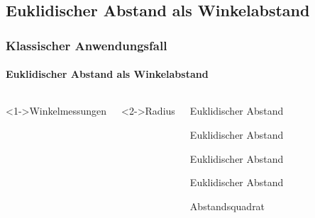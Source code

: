 \documentclass{beamer}
\begin{document}
\subsection{Euklidischer Abstand als Winkelabstand}
\begin{frame}
\frametitle{Klassischer Anwendungsfall}
\framesubtitle{Euklidischer Abstand als Winkelabstand}
\begin{columns}[c]
	\begin{block}<1->{Winkelmessungen}
	\end{block}
	\begin{block}<2->{Radius}
	\end{block}
	\begin{overprint}
		\begin{block}{Euklidischer Abstand}
		\end{block}
		\begin{block}{Euklidischer Abstand}
		\end{block}
		\begin{block}{Euklidischer Abstand}
		\end{block}
		\begin{block}{Euklidischer Abstand}
		\end{block}
		\begin{block}{Abstandsquadrat}
		\end{block}
	\end{overprint}


\end{columns}
\end{frame}
\end{document}
